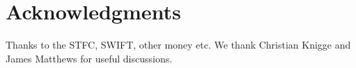 \documentclass[useAMS,usenatbib]{sam}
\begin{document}

\section*{Acknowledgments}

Thanks to the STFC, SWIFT, other money etc. We thank Christian Knigge and James Matthews for useful discussions.


\end{document}

